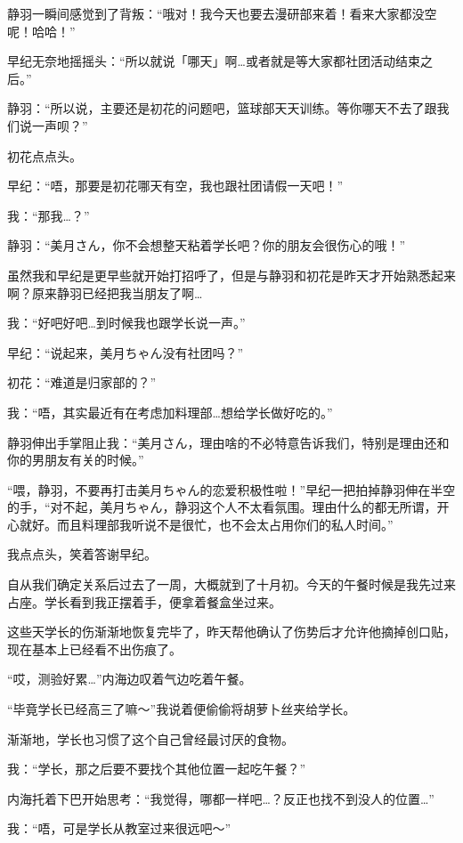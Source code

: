 静羽一瞬间感觉到了背叛：“哦对！我今天也要去漫研部来着！看来大家都没空呢！哈哈！”

早纪无奈地摇摇头：“所以就说「哪天」啊…或者就是等大家都社团活动结束之后。”

静羽：“所以说，主要还是初花的问题吧，篮球部天天训练。等你哪天不去了跟我们说一声呗？”

初花点点头。

早纪：“唔，那要是初花哪天有空，我也跟社团请假一天吧！”

我：“那我…？”

静羽：“美月さん，你不会想整天粘着学长吧？你的朋友会很伤心的哦！”

虽然我和早纪是更早些就开始打招呼了，但是与静羽和初花是昨天才开始熟悉起来啊？原来静羽已经把我当朋友了啊…

我：“好吧好吧…到时候我也跟学长说一声。”

早纪：“说起来，美月ちゃん没有社团吗？”

初花：“难道是归家部的？”

我：“唔，其实最近有在考虑加料理部…想给学长做好吃的。”

静羽伸出手掌阻止我：“美月さん，理由啥的不必特意告诉我们，特别是理由还和你的男朋友有关的时候。”

“喂，静羽，不要再打击美月ちゃん的恋爱积极性啦！”早纪一把拍掉静羽伸在半空的手，“对不起，美月ちゃん，静羽这个人不太看氛围。理由什么的都无所谓，开心就好。而且料理部我听说不是很忙，也不会太占用你们的私人时间。”

我点点头，笑着答谢早纪。


\newday{\food\cloudy}



自从我们确定关系后过去了一周，大概就到了十月初。今天的午餐时候是我先过来占座。学长看到我正摆着手，便拿着餐盒坐过来。

这些天学长的伤渐渐地恢复完毕了，昨天帮他确认了伤势后才允许他摘掉创口贴，现在基本上已经看不出伤痕了。

“哎，测验好累…”内海边叹着气边吃着午餐。

“毕竟学长已经高三了嘛～”我说着便偷偷将胡萝卜丝夹给学长。

渐渐地，学长也习惯了这个自己曾经最讨厌的食物。

我：“学长，那之后要不要找个其他位置一起吃午餐？”

内海托着下巴开始思考：“我觉得，哪都一样吧…？反正也找不到没人的位置…”

我：“唔，可是学长从教室过来很远吧～”

